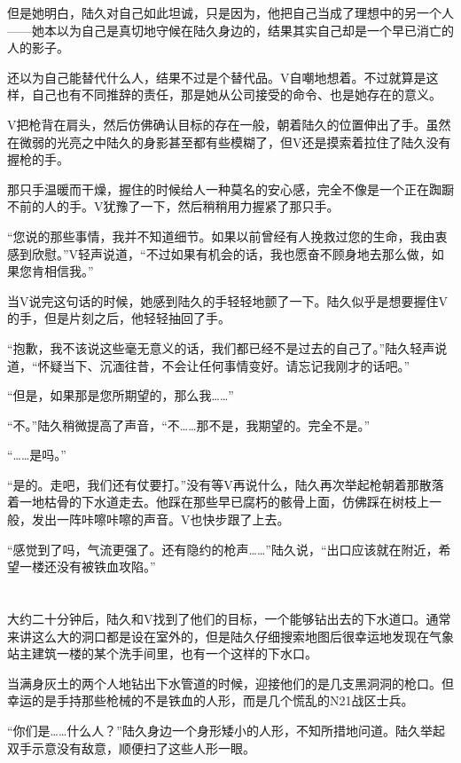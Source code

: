 但是她明白，陆久对自己如此坦诚，只是因为，他把自己当成了理想中的另一个人——她本以为自己是真切地守候在陆久身边的，结果其实自己却是一个早已消亡的人的影子。

还以为自己能替代什么人，结果不过是个替代品。V自嘲地想着。不过就算是这样，自己也有不同推辞的责任，那是她从公司接受的命令、也是她存在的意义。

V把枪背在肩头，然后仿佛确认目标的存在一般，朝着陆久的位置伸出了手。虽然在微弱的光亮之中陆久的身影甚至都有些模糊了，但V还是摸索着拉住了陆久没有握枪的手。

那只手温暖而干燥，握住的时候给人一种莫名的安心感，完全不像是一个正在踟蹰不前的人的手。V犹豫了一下，然后稍稍用力握紧了那只手。

“您说的那些事情，我并不知道细节。如果以前曾经有人挽救过您的生命，我由衷感到欣慰。”V轻声说道，“不过如果有机会的话，我也愿奋不顾身地去那么做，如果您肯相信我。”

当V说完这句话的时候，她感到陆久的手轻轻地颤了一下。陆久似乎是想要握住V的手，但是片刻之后，他轻轻抽回了手。

“抱歉，我不该说这些毫无意义的话，我们都已经不是过去的自己了。”陆久轻声说道，“怀疑当下、沉湎往昔，不会让任何事情变好。请忘记我刚才的话吧。”

“但是，如果那是您所期望的，那么我……”

“不。”陆久稍微提高了声音，“不……那不是，我期望的。完全不是。”

“……是吗。”

“是的。走吧，我们还有仗要打。”没有等V再说什么，陆久再次举起枪朝着那散落着一地枯骨的下水道走去。他踩在那些早已腐朽的骸骨上面，仿佛踩在树枝上一般，发出一阵咔嚓咔嚓的声音。V也快步跟了上去。

“感觉到了吗，气流更强了。还有隐约的枪声……”陆久说，“出口应该就在附近，希望一楼还没有被铁血攻陷。” 

\section*{}

大约二十分钟后，陆久和V找到了他们的目标，一个能够钻出去的下水道口。通常来讲这么大的洞口都是设在室外的，但是陆久仔细搜索地图后很幸运地发现在气象站主建筑一楼的某个洗手间里，也有一个这样的下水口。

当满身灰土的两个人地钻出下水管道的时候，迎接他们的是几支黑洞洞的枪口。但幸运的是手持那些枪械的不是铁血的人形，而是几个慌乱的N21战区士兵。

“你们是……什么人？”陆久身边一个身形矮小的人形，不知所措地问道。陆久举起双手示意没有敌意，顺便扫了这些人形一眼。

